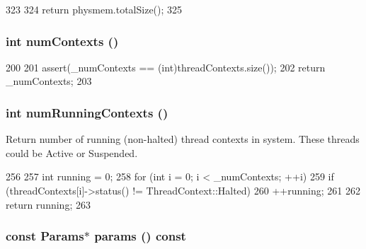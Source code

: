 \begin{DoxyCode}
323 {
324     return physmem.totalSize();
325 }
\end{DoxyCode}
\hypertarget{classSystem_a905b96f2c022dcde596bdb806661bcae}{
\subsubsection[{numContexts}]{\setlength{\rightskip}{0pt plus 5cm}int numContexts ()}}
\label{classSystem_a905b96f2c022dcde596bdb806661bcae}



\begin{DoxyCode}
200     {
201         assert(_numContexts == (int)threadContexts.size());
202         return _numContexts;
203     }
\end{DoxyCode}
\hypertarget{classSystem_af17f73eb71dfedfb91e4f39e7bb732ce}{
\subsubsection[{numRunningContexts}]{\setlength{\rightskip}{0pt plus 5cm}int numRunningContexts ()}}
\label{classSystem_af17f73eb71dfedfb91e4f39e7bb732ce}
Return number of running (non-\/halted) thread contexts in system. These threads could be Active or Suspended. 


\begin{DoxyCode}
256 {
257     int running = 0;
258     for (int i = 0; i < _numContexts; ++i) {
259         if (threadContexts[i]->status() != ThreadContext::Halted)
260             ++running;
261     }
262     return running;
263 }
\end{DoxyCode}
\hypertarget{classSystem_acd3c3feb78ae7a8f88fe0f110a718dff}{
\subsubsection[{params}]{\setlength{\rightskip}{0pt plus 5cm}const {\bf Params}$\ast$ params () const}}
\label{classSystem_acd3c3feb78ae7a8f88fe0f110a718dff}


